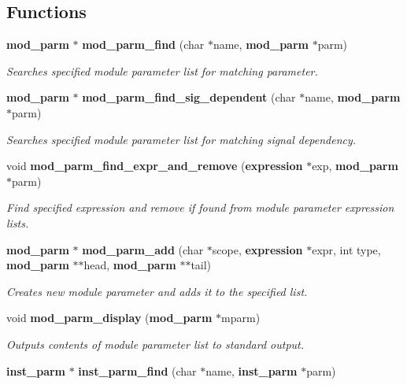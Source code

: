 \subsection*{Functions}
\begin{CompactItemize}
\item 
{\bf mod\_\-parm} $\ast$ {\bf mod\_\-parm\_\-find} (char $\ast$name, {\bf mod\_\-parm} $\ast$parm)
\begin{CompactList}\small\item\em Searches specified module parameter list for matching parameter.\item\end{CompactList}\item 
{\bf mod\_\-parm} $\ast$ {\bf mod\_\-parm\_\-find\_\-sig\_\-dependent} (char $\ast$name, {\bf mod\_\-parm} $\ast$parm)
\begin{CompactList}\small\item\em Searches specified module parameter list for matching signal dependency.\item\end{CompactList}\item 
void {\bf mod\_\-parm\_\-find\_\-expr\_\-and\_\-remove} ({\bf expression} $\ast$exp, {\bf mod\_\-parm} $\ast$parm)
\begin{CompactList}\small\item\em Find specified expression and remove if found from module parameter expression lists.\item\end{CompactList}\item 
{\bf mod\_\-parm} $\ast$ {\bf mod\_\-parm\_\-add} (char $\ast$scope, {\bf expression} $\ast$expr, int type, {\bf mod\_\-parm} $\ast$$\ast$head, {\bf mod\_\-parm} $\ast$$\ast$tail)
\begin{CompactList}\small\item\em Creates new module parameter and adds it to the specified list.\item\end{CompactList}\item 
void {\bf mod\_\-parm\_\-display} ({\bf mod\_\-parm} $\ast$mparm)
\begin{CompactList}\small\item\em Outputs contents of module parameter list to standard output.\item\end{CompactList}\item 
{\bf inst\_\-parm} $\ast$ {\bf inst\_\-parm\_\-find} (char $\ast$name, {\bf inst\_\-parm} $\ast$parm)

\end{CompactItemize}
